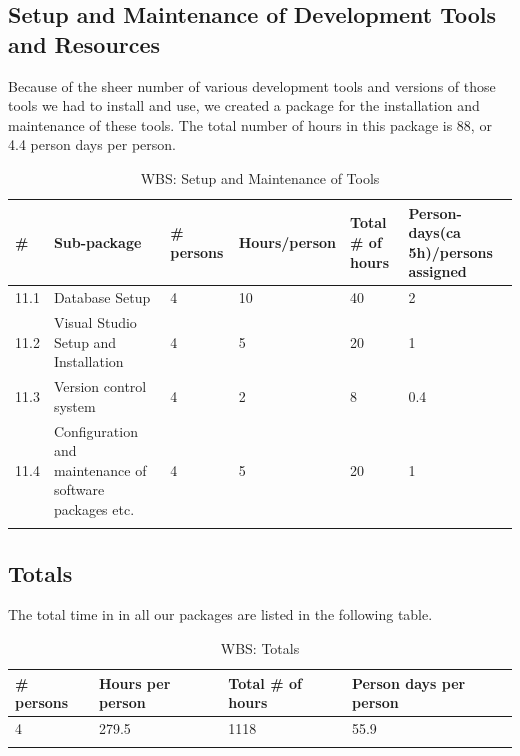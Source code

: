 \newpage
\subsection{Setup and Maintenance of Development Tools and Resources}
Because of the sheer number of various development tools and versions of those tools we had to install and use, we created a package for the installation and maintenance of these tools. The total number of hours in this package is 88, or 4.4 person days per person.
\begin{longtable}{|p{0.7cm}|p{3cm}|p{1.8cm}|p{2.5cm}|p{2cm}|p{2.8cm}|}
\hline
\# & Sub-package & \# persons & Hours/person & Total \# of hours & Person-days(ca 5h)/persons assigned\\ 
\hline
11.1 & Database Setup & 4 & 10 & 40 & 2\\ 
\hline
11.2 & Visual Studio Setup and Installation & 4 & 5 & 20 & 1\\
\hline
11.3 & Version control system & 4 & 2 & 8 & 0.4\\ 
\hline
11.4 & Configuration and maintenance of software packages etc. & 4 & 5 & 20 & 1\\ 
\hline
\caption{WBS: Setup and Maintenance of Tools}
\end{longtable}

\subsection{Totals}
The total time in in all our packages are listed in the following table.
\begin{longtable}{|p{2cm}|p{3cm}|p{3cm}|p{4.5cm}|}
\hline
\# persons & Hours per person & Total \# of hours & Person days per person\\ 
\hline
4 & 279.5 & 1118 & 55.9\\ 
\hline
\caption{WBS: Totals}
\end{longtable}

